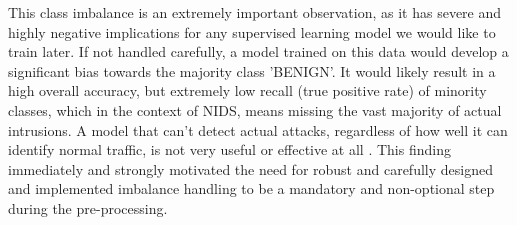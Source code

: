 This class imbalance is an extremely important observation, as it has severe and highly negative implications for any supervised learning model we would like to train later. If not handled carefully, a model trained on this data would develop a significant bias towards the majority class 'BENIGN'. It would likely result in a high overall accuracy, but extremely low recall (true positive rate) of minority classes, which in the context of NIDS, means missing the vast majority of actual intrusions. A model that can't detect actual attacks, regardless of how well it can identify normal traffic, is not very useful or effective at all \parencite{aldhubaib2024network1}. This finding immediately and strongly motivated the need for robust and carefully designed and implemented imbalance handling to be a mandatory and non-optional step during the pre-processing.

